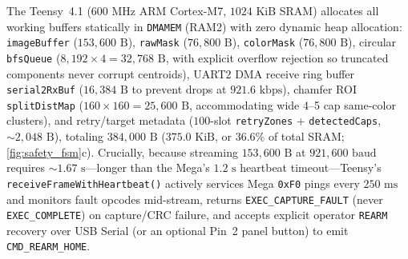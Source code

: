 \documentclass[10pt,twocolumn,letterpaper]{article}
\begin{document}
The Teensy~4.1 ($600\text{ MHz}$ ARM Cortex-M7, $1024\text{ KiB}$ SRAM) allocates all working buffers statically in \texttt{DMAMEM} (RAM2) with zero dynamic heap allocation: \texttt{imageBuffer} ($153{,}600\text{ B}$), \texttt{rawMask} ($76{,}800\text{ B}$), \texttt{colorMask} ($76{,}800\text{ B}$), circular \texttt{bfsQueue} ($8{,}192\times 4 = 32{,}768\text{ B}$, with explicit overflow rejection so truncated components never corrupt centroids), UART2 DMA receive ring buffer \texttt{serial2RxBuf} ($16{,}384\text{ B}$ to prevent drops at $921.6\text{ kbps}$), chamfer ROI \texttt{splitDistMap} ($160\times 160 = 25{,}600\text{ B}$, accommodating wide 4--5 cap same-color clusters), and retry/target metadata ($100$-slot \texttt{retryZones} + \texttt{detectedCaps}, $\sim 2{,}048\text{ B}$), totaling $384{,}000\text{ B}$ ($375.0\text{ KiB}$, or $36.6\%$ of total SRAM; \cref{fig:safety_fsm}c). Crucially, because streaming $153{,}600\text{ B}$ at $921{,}600\text{ baud}$ requires $\sim 1.67\text{ s}$—longer than the Mega's $1.2\text{ s}$ heartbeat timeout—Teensy's \texttt{receiveFrameWithHeartbeat()} actively services Mega \texttt{0xF0} pings every $250\text{ ms}$ and monitors fault opcodes mid-stream, returns \texttt{EXEC\_CAPTURE\_FAULT} (never \texttt{EXEC\_COMPLETE}) on capture/CRC failure, and accepts explicit operator \texttt{REARM} recovery over USB Serial (or an optional Pin~2 panel button) to emit \texttt{CMD\_REARM\_HOME}.
\end{document}

